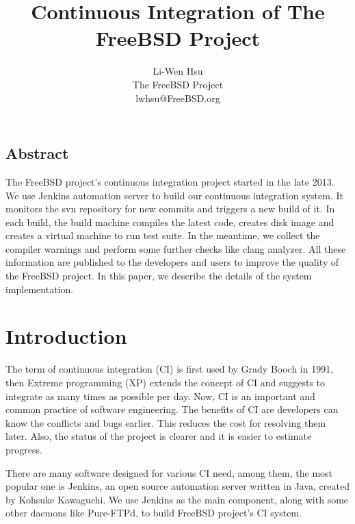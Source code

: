 \documentclass[a4paper,twocolumn,10pt]{article}
\begin{document}
\date{}

\title{\Large \bf Continuous Integration of The FreeBSD Project}

\author{
{\rm Li-Wen Hsu}\\
The FreeBSD Project\\
lwhsu@FreeBSD.org
}

\maketitle

\thispagestyle{empty}

\subsection*{Abstract}
The FreeBSD project's continuous integration project started in the late 2013.
We use Jenkins automation server to build our continuous integration system.
It monitors the svn repository for new commits and triggers a new build of it.
In each build, the build machine compiles the latest code, creates disk image
and creates a virtual machine to run test suite. In the meantime, we collect
the compiler warnings and perform some further checks like clang analyzer. All
these information are published to the developers and users to improve the
quality of the FreeBSD project. In this paper, we describe the details of the
system implementation.

\section{Introduction}

The term of continuous integration (CI) is first used by Grady Booch in 1991,
then Extreme programming (XP) extends the concept of CI and suggests to
integrate as many times as possible per day. Now, CI is an important and common
practice of software engineering. The benefits of CI are developers can know
the conflicts and bugs earlier. This reduces the cost for resolving them later.
Also, the status of the project is clearer and it is easier to estimate
progress.

There are many software designed for various CI need, among them, the most
popular one is Jenkins, an open source automation server written in Java,
created by Kohsuke Kawaguchi. We use Jenkins as the main component, along with
some other daemons like Pure-FTPd, to build FreeBSD project's CI system.
\end{document}
